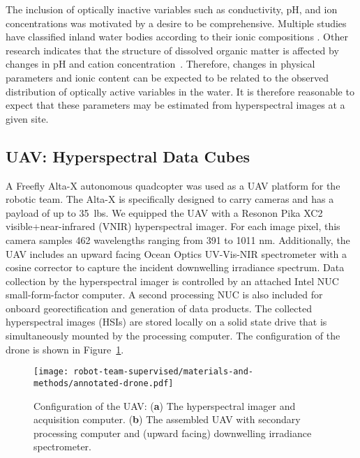 The inclusion of optically inactive variables such as conductivity, pH, and ion concentrations was motivated by a desire to be comprehensive. Multiple studies have classified inland water bodies according to their ionic compositions \cite{piper1944graphic, dordoni2023preliminary}. Other research indicates that the structure of dissolved organic matter is affected by changes in pH and cation concentration~\cite{pace2012ph}. Therefore, changes in physical parameters and ionic content can be expected to be related to the observed distribution of optically active variables in the water. It is therefore reasonable to expect that these parameters may be estimated from hyperspectral images at a given site. 


\subsection{UAV: Hyperspectral Data Cubes}

A Freefly Alta-X autonomous quadcopter was used as a UAV platform for the robotic team. The Alta-X is specifically designed to carry cameras and has a payload of up to 35~lbs. We equipped the UAV with a Resonon Pika XC2 visible+near-infrared (VNIR) hyperspectral imager. For each image pixel, this camera samples 462 wavelengths ranging from 391 to 1011 nm.  Additionally, the UAV includes an upward facing Ocean Optics UV-Vis-NIR spectrometer with a cosine corrector to capture the incident downwelling irradiance spectrum. Data collection by the hyperspectral imager is controlled by an attached Intel NUC small-form-factor computer. A second processing NUC is also included for onboard georectification and generation of data products. The collected hyperspectral images (HSIs) are stored locally on a solid state drive that is simultaneously mounted by the processing computer. The configuration of the drone is shown in Figure~\ref{fig:drone-components}.

\begin{figure}[H]
\vspace{-0.3in}
\hspace{-16pt}\texttt{[image: robot-team-supervised/materials-and-methods/annotated-drone.pdf]}
\vspace{-0.2in}
\caption{Configuration of the UAV: (\textbf{a}) The hyperspectral imager and acquisition computer. (\textbf{b}) The assembled UAV with secondary processing computer and (upward facing) downwelling irradiance spectrometer. \label{fig:drone-components}}
\end{figure} 

